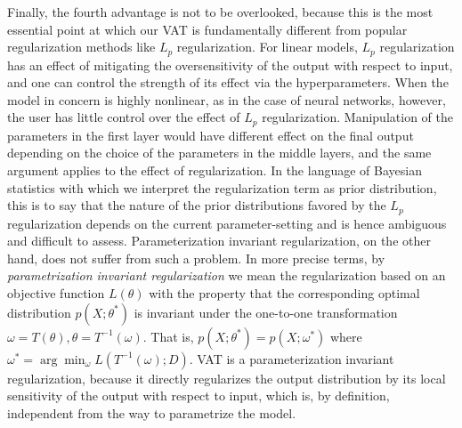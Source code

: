 \documentclass[10pt,journal,compsoc]{IEEEtran}
\newcommand\iwrite[1]{\textcolor{red}{Meada: #1}}
\begin{document}
Finally, the fourth advantage is not to be overlooked, because this is the most essential point at which our VAT is fundamentally different from popular regularization methods like $L_p$ regularization. For linear models, $L_p$ regularization has an effect of mitigating the oversensitivity of the output with respect to input, and one can control the strength of its effect via the hyperparameters. 
When the model in concern is highly nonlinear, as in the case of neural networks, however, the user has little control over the effect of $L_p$ regularization. 
Manipulation of the parameters in the first layer would have different effect on the final output depending on the choice of the parameters in the middle layers, and the same argument applies to the effect of regularization. 
In the language of Bayesian statistics with which we interpret the regularization term as prior distribution, this is to say that the nature of the prior distributions favored by the $L_p$ regularization depends on the current parameter-setting and is hence ambiguous and difficult to assess. 
Parameterization invariant regularization, on the other hand, does not suffer from such a problem.
In more precise terms, by \textit{parametrization invariant regularization} we mean the regularization based on an objective function $L(\theta)$ with the property that the corresponding optimal distribution $p(X;\theta^*)$ is invariant under the  one-to-one transformation $\omega = T(\theta), \theta = T^{-1}(\omega)$. 
That is, $p(X;\theta^*) = p(X;\omega^*)$ where $\omega^* = \arg \min _{\omega}L(T^{-1}(\omega) ;D) $. 
VAT is a parameterization invariant regularization, because it directly regularizes the output distribution by its local sensitivity of the output with respect to input, which is, by definition, independent from the way to parametrize the model.
\end{document}
